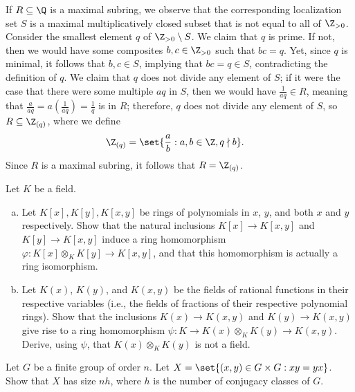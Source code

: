 \documentclass[10pt]{mypackage}
\begin{document}
\begin{solution}
\begin{enumerate}[(a)]
      If $R\subseteq \Q$ is a maximal subring, we observe that the corresponding localization set $S$ is a maximal multiplicatively closed subset that is not equal to all of $\Z_{>0}$. Consider the smallest element $q$ of $\Z_{> 0}\setminus S$. We claim that $q$ is prime. If not, then we would have some composites $b,c\in \Z_{> 0}$ such that $bc = q$. Yet, since $q$ is minimal, it follows that $b,c\in S$, implying that $bc = q\in S$, contradicting the definition of $q$. We claim that $q$ does not divide any element of $S$; if it were the case that there were some multiple $aq$ in $S$, then we would have $\frac{1}{aq}\in R$, meaning that $\frac{a}{aq} = a\left( \frac{1}{aq} \right) = \frac{1}{q}$ is in $R$; therefore, $q$ does not divide any element of $S$, so $R\subseteq \Z_{(q)}$, where we define
      \begin{align*}
        \Z_{(q)} &= \set{\frac{a}{b} : a,b\in \Z,q \nmid b}.
      \end{align*}
      Since $R$ is a maximal subring, it follows that $R = \Z_{(q)}$.
  \end{enumerate}
\end{solution}
\begin{problem}[Problem 2]
  Let $K$ be a field.
  \begin{enumerate}[(a)]
    \item Let $K[x],K[y],K[x,y]$ be rings of polynomials in $x$, $y$, and both $x$ and $y$ respectively. Show that the natural inclusions $K[x]\rightarrow K\left[ x,y \right]$ and $K[y]\rightarrow K\left[ x,y \right]$ induce a ring homomorphism $\varphi\colon K[x]\otimes_{K}K[y]\rightarrow K\left[ x,y \right]$, and that this homomorphism is actually a ring isomorphism.
    \item Let $K(x)$, $K(y)$, and $K(x,y)$ be the fields of rational functions in their respective variables (i.e., the fields of fractions of their respective polynomial rings). Show that the inclusions $K(x)\rightarrow K\left( x,y \right)$ and $K\left( y \right)\rightarrow K\left( x,y \right)$ give rise to a ring homomorphism $\psi\colon K\rightarrow K(x)\otimes_{K}K(y)\rightarrow K\left( x,y \right)$. Derive, using $\psi$, that $K\left( x \right)\otimes_{K}K\left( y \right)$ is not a field.
  \end{enumerate}
\end{problem}
\begin{problem}[Problem 3]
  Let $G$ be a finite group of order $n$. Let $X = \set{\left( x,y \right)\in G\times G : xy = yx}$. Show that $X$ has size $nh$, where $h$ is the number of conjugacy classes of $G$.
\end{problem}
\end{document}
